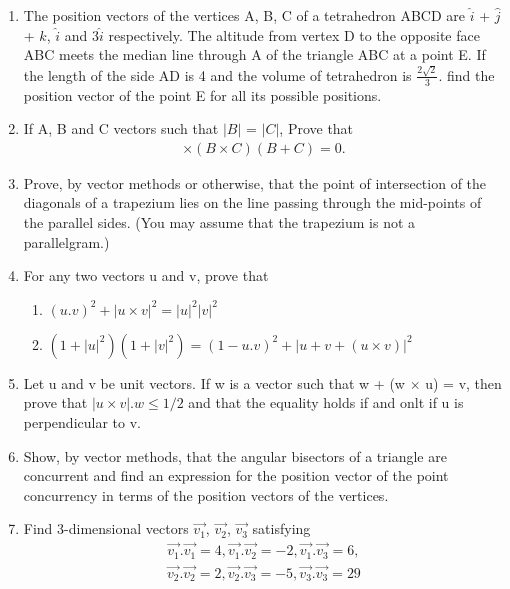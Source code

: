 \begin{enumerate}[label=\arabic*.,ref=\thesubsection.\theenumi]
\item The position vectors of the vertices A, B, C of a tetrahedron ABCD are $\hat{i}$ + $\hat{j}$ + $\hat{k}$, $\hat{i}$ and 3$\hat{i}$ respectively. The altitude from vertex D to the opposite face ABC meets the median line through A of the triangle ABC at a point E. If the length of the side AD is 4 and the volume of tetrahedron is $\frac{2\sqrt{2}}{3}$. find the position vector of the point E for all its possible positions.

\item If A, B and C vectors such that $|B|$ = $|C|$, Prove that
\begin{align*}
[(A+B) \times (A+C)] \times (B \times C)(B + C) = 0.
\end{align*}

\item Prove, by vector methods or otherwise, that the point of intersection of the diagonals of a trapezium lies on the line passing through the mid-points of the parallel sides. (You may assume that the trapezium is not a parallelgram.)

\item For any two vectors u and v, prove that
\begin{enumerate}
\item $(u.v)^{2} + |u \times v|^{2} = |u|^{2}|v|^{2}$
\item $(1 + |u|^{2})(1 + |v|^{2}) = (1 - u.v)^{2} + |u + v + (u \times v)|^{2}$
\end{enumerate}

\item Let u and v be unit vectors. If w is a vector such that w + (w $\times$ u) = v, then prove that $|u \times v|.w \leq 1/2$ and that the equality holds if and onlt if u is perpendicular to v.

\item Show, by vector methods, that the angular bisectors of a triangle are concurrent and find an expression for the position vector of the point concurrency in terms of the position vectors of the vertices.

\item Find 3-dimensional vectors $\overrightarrow{v_1}$, $\overrightarrow{v_2}$, $\overrightarrow{v_3}$ satisfying
\begin{align*}
\overrightarrow{v_1}.\overrightarrow{v_1} = 4, \overrightarrow{v_1}.\overrightarrow{v_2} = -2, \overrightarrow{v_1}.\overrightarrow{v_3} = 6, 
\end{align*}
\begin{align*}
\overrightarrow{v_2}.\overrightarrow{v_2} = 2, \overrightarrow{v_2}.\overrightarrow{v_3} = -5, \overrightarrow{v_3}.\overrightarrow{v_3} = 29
\end{align*}


\end{enumerate}
